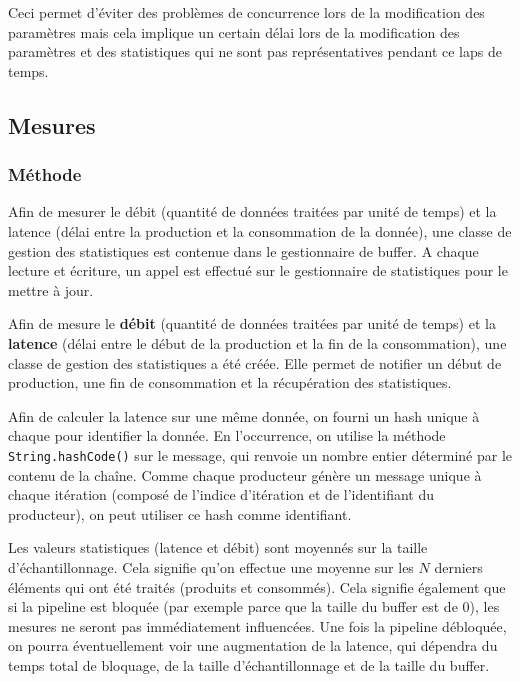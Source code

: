 \documentclass[
  french,
  a4paper,
]{scrartcl}
\begin{document}
Ceci permet d'éviter des problèmes de concurrence lors de la modification des paramètres mais 
cela implique un certain délai lors de la modification des paramètres et des 
statistiques qui ne sont pas représentatives pendant ce laps de temps.

\subsection{Mesures}

\subsubsection*{Méthode}

Afin de mesurer le débit (quantité de données traitées par unité de temps) et la 
latence (délai entre la production et la consommation de la donnée), une classe 
de gestion des statistiques est contenue dans le gestionnaire de buffer. 
A chaque lecture et écriture, 
un appel est effectué sur le gestionnaire de statistiques pour le mettre à jour.

Afin de mesure le \textbf{débit} (quantité de données traitées par unité de temps) et la 
\textbf{latence} (délai entre le début de la production et la fin de la consommation), une 
classe de gestion des statistiques a été créée. Elle permet de notifier un début de production, 
une fin de consommation et la récupération des statistiques. 

Afin de calculer la latence sur une même donnée, on fourni un hash unique à chaque pour 
identifier la donnée. En l'occurrence, on utilise la méthode \lstinline{String.hashCode()}
sur le message, qui renvoie un nombre entier déterminé par le contenu de la chaîne. Comme 
chaque producteur génère un message unique à chaque itération (composé de 
l'indice d'itération et de l'identifiant du producteur), on peut utiliser ce hash 
comme identifiant. 

Les valeurs statistiques (latence et débit) sont moyennés sur la taille d'échantillonnage. Cela signifie 
qu'on effectue une moyenne sur les $N$ derniers éléments qui ont été traités (produits et consommés). 
Cela signifie également que si la pipeline est bloquée (par exemple parce que la taille du buffer est de 0), 
les mesures ne seront pas immédiatement influencées. Une fois la pipeline débloquée, on pourra 
éventuellement voir une augmentation de la latence, qui dépendra du temps total de bloquage, de la 
taille d'échantillonnage et de la taille du buffer. 
\end{document}
